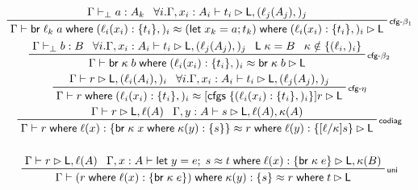 \documentclass[acmsmall,screen,review]{acmart}
\newcommand{\ms}[1]{\ensuremath{\mathsf{#1}}}
\newcommand{\lto}{:}
\newcommand{\letexpr}[3]{\ensuremath{\ms{let}\;#1 = #2;\;#3}}
\newcommand{\letstmt}[3]{\ensuremath{\ms{let}\;#1 = #2; #3}}
\newcommand{\brb}[2]{\ms{br}\;#1\;#2}
\newcommand{\where}[2]{#1\;\ms{where}\;#2}
\newcommand{\wbranch}[3]{#1(#2) \lto \{#3\}}
\newcommand{\cfgsubst}[1]{\ms{cfgs}\;\{#1\}}
\newcommand{\bhyp}[2]{#1 : #2}
\newcommand{\lhyp}[2]{#1(#2)}
\newcommand{\rle}[1]{{\scriptsize\textsf{#1}}}
\newcommand{\hasty}[4]{#1 \vdash_{#2} #3: {#4}}
\newcommand{\haslb}[3]{#1 \vdash #2 \rhd #3}
\newcommand{\teqv}{\approx}
\newcommand{\lbeq}[4]{#1 \vdash #2 \teqv #3 \rhd {#4}}
\begin{document}
\begin{figure}
  \begin{gather*}
      \prftree[r]{\rle{cfg-$\beta_1$}}
        {\hasty{\Gamma}{\bot}{a}{A_k}}
        {\forall i. \haslb{\Gamma, \bhyp{x_i}{A_i}}{t_i}{\ms{L}, (\lhyp{\ell_j}{A_j},)_j}}
        {\lbeq{\Gamma}
          {\where{\brb{\ell_k}{a}}{(\wbranch{\ell_i}{x_i}{t_i},)_i}}
          {\where{(\letstmt{x_k}{a}{t_k})}{(\wbranch{\ell_i}{x_i}{t_i},)_i}}
          {\ms{L}}}
      \\
      \prftree[r]{\rle{cfg-$\beta_2$}}
        {\hasty{\Gamma}{\bot}{b}{B}}
        {\forall i. \haslb{\Gamma, \bhyp{x_i}{A_i}}{t_i}{\ms{L}, (\lhyp{\ell_j}{A_j},)_j}}
        {\ms{L}\;\kappa = B}
        {\kappa \notin \{(\ell_i,)_i\}}
        {\lbeq{\Gamma}
          {\where{\brb{\kappa}{b}}{(\wbranch{\ell_i}{x_i}{t_i},)_i}}
          {\brb{\kappa}{b}}
          {\ms{L}}}
      \\
        \prftree[r]{\rle{cfg-$\eta$}}
        {\haslb{\Gamma}{r}{\ms{L}, (\lhyp{\ell_i}{A_i},)_i}}
        {\forall i. \haslb{\Gamma, \bhyp{x_i}{A_i}}{t_i}{\ms{L}, (\lhyp{\ell_j}{A_j},)_j}}
        {
          \lbeq{\Gamma}
            {\where{r}{(\wbranch{\ell_i}{x_i}{t_i},)_i}}
            {[\cfgsubst{(\wbranch{\ell_i}{x_i}{t_i},)_i}]r}
            {\ms{L}}
        }
      \\
      \prftree[r]{\rle{codiag}}
        {\haslb{\Gamma}{r}{\ms{L}, \ell(A)}}
        {\haslb{\Gamma, \bhyp{y}{A}}{s}{\ms{L}, \ell(A), \kappa(A)}}
        {\lbeq{\Gamma}{\where{r}{\wbranch{\ell}{x}{\where{\brb{\kappa}{x}}
          {\wbranch{\kappa}{y}{s}}}}}
        {\where{r}{\wbranch{\ell}{y}{[\ell/\kappa]s}}}
        {\ms{L}}} 
      \\
      \\
      \prftree[r]{\rle{uni}}
        {
          \haslb{\Gamma}{r}{\ms{L}, \ell(A)}
        }
        {
          \lbeq{\Gamma, \bhyp{x}{A}}
            {\letexpr{y}{e}{s}}
            {\where{t}{\wbranch{\ell}{x}{\brb{\kappa}{e}}}}
            {\ms{L}, \kappa(B)}
        }
        {
          \lbeq{\Gamma}
            {\where{(\where{r}{\wbranch{\ell}{x}{\brb{\kappa}{e}}})}
              {\wbranch{\kappa}{y}{s}}}
            {\where{r}{t}}
            {\ms{L}}
        }
      \\

\end{gather*}
\end{figure}
\end{document}

